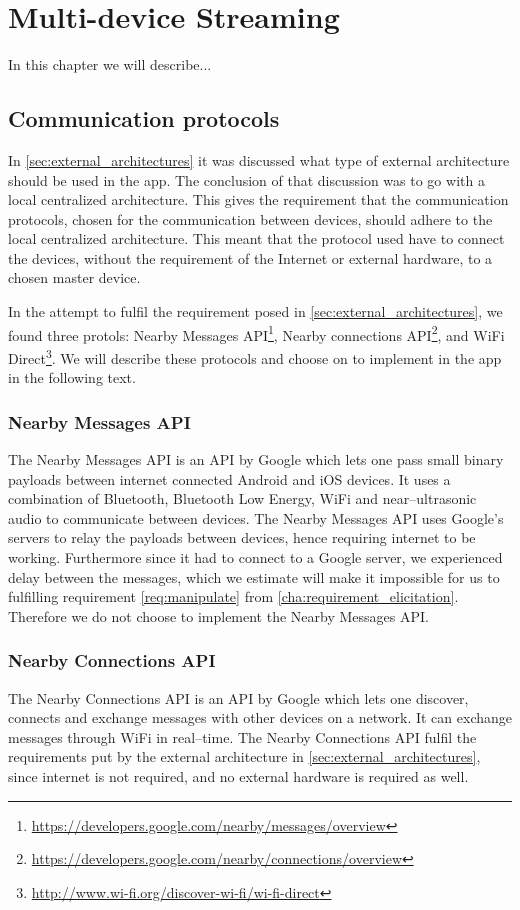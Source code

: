 \chapter{Multi-device Streaming}
In this chapter we will describe...

\section{Communication protocols}
In \cref{sec:external_architectures} it was discussed what type of external architecture should be used in the app.
The conclusion of that discussion was to go with a local centralized architecture.
This gives the requirement that the communication protocols, chosen for the communication between devices,
should adhere to the local centralized architecture.
This meant that the protocol used have to connect the devices, without the requirement of the Internet or external hardware, to a chosen master device.

In the attempt to fulfil the requirement posed in \cref{sec:external_architectures}, we found three protols: Nearby Messages API\footnote{\url{https://developers.google.com/nearby/messages/overview}}, Nearby connections API\footnote{\url{https://developers.google.com/nearby/connections/overview}}, and WiFi Direct\footnote{\url{http://www.wi-fi.org/discover-wi-fi/wi-fi-direct}}.
We will describe these protocols and choose on to implement in the app in the following text.

\subsection{Nearby Messages API}
The Nearby Messages API is an API by Google which lets one pass small binary payloads between internet connected Android and iOS devices. 
It uses a combination of Bluetooth, Bluetooth Low Energy, WiFi and near--ultrasonic audio to communicate between devices.
The Nearby Messages API uses Google's servers to relay the payloads between devices, hence requiring internet to be working. 
Furthermore since it had to connect to a Google server, we experienced delay between the messages,
which we estimate will make it impossible for us to fulfilling requirement \ref{req:manipulate} from \cref{cha:requirement_elicitation}.
Therefore we do not choose to implement the Nearby Messages API.\cite{nearby_messages}

\subsection{Nearby Connections API}
The Nearby Connections API is an API by Google which lets one discover, connects and exchange messages with other devices on a network. 
It can exchange messages through WiFi in real--time.\cite{nearby_connection} 
The Nearby Connections API fulfil the requirements put by the external architecture in \cref{sec:external_architectures},
since internet is not required, and no external hardware is required as well.

